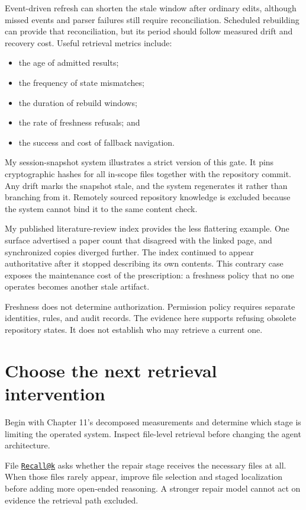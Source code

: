 Event-driven refresh can shorten the stale window after ordinary edits, although missed events and parser failures still require reconciliation. Scheduled rebuilding can provide that reconciliation, but its period should follow measured drift and recovery cost. Useful retrieval metrics include:

\begin{itemize}
\tightlist
\item
  the age of admitted results;
\item
  the frequency of state mismatches;
\item
  the duration of rebuild windows;
\item
  the rate of freshness refusals; and
\item
  the success and cost of fallback navigation.
\end{itemize}

My session-snapshot system illustrates a strict version of this gate. It pins cryptographic hashes for all in-scope files together with the repository commit. Any drift marks the snapshot stale, and the system regenerates it rather than branching from it. Remotely sourced repository knowledge is excluded because the system cannot bind it to the same content check.

My published literature-review index provides the less flattering example. One surface advertised a paper count that disagreed with the linked page, and synchronized copies diverged further. The index continued to appear authoritative after it stopped describing its own contents. This contrary case exposes the maintenance cost of the prescription: a freshness policy that no one operates becomes another stale artifact.

Freshness does not determine authorization. Permission policy requires separate identities, rules, and audit records. The evidence here supports refusing obsolete repository states. It does not establish who may retrieve a current one.

\section{Choose the next retrieval intervention}\label{choose-the-next-retrieval-intervention}

Begin with Chapter 11's decomposed measurements and determine which stage is limiting the operated system. Inspect file-level retrieval before changing the agent architecture.

File \href{mailto:Recall@k}{\nolinkurl{Recall@k}} asks whether the repair stage receives the necessary files at all. When those files rarely appear, improve file selection and staged localization before adding more open-ended reasoning. A stronger repair model cannot act on evidence the retrieval path excluded.

